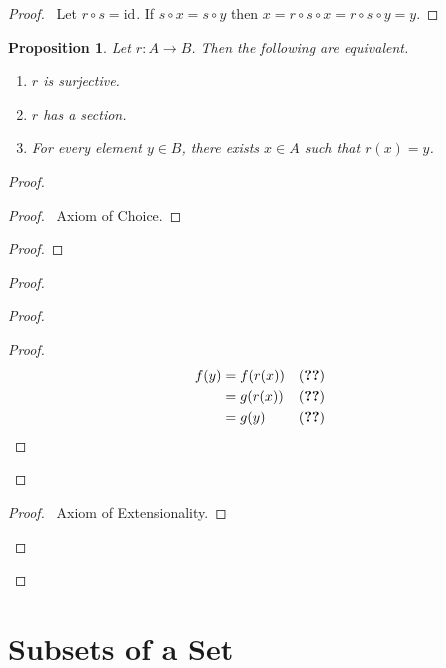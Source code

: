 \documentclass{book}
\let\qed\relax
\newtheorem{prop}[ax]{Proposition}
\theoremstyle{definition}
\newcommand{\id}[1]{\ensuremath{\mathrm{id}_{#1}}}
\begin{document}
\begin{proof}
\pf\ Let $r \circ s = \id{}$. If $s \circ x = s \circ y$ then $x = r \circ s \circ x = r \circ s \circ y = y$. \qed
\end{proof}

\begin{prop}
Let $r : A \rightarrow B$. Then the following are equivalent.
\begin{enumerate}
\item $r$ is surjective.
\item $r$ has a section.
\item For every element $y \in B$, there exists $x \in A$ such that $r(x) = y$.
\end{enumerate}
\end{prop}

\begin{proof}
\pf
{}
\begin{proof}
	\pf\ Axiom of Choice.
\end{proof}
\begin{proof}
\end{proof}
\begin{proof}
	\begin{proof}
		\begin{proof}
			\pf
			\begin{align*}
				f(y) & = f(r(x)) & (\text{\stepref{ii}}) \\
				& = g(r(x)) & (\text{\stepref{c}}) \\
				& = g(y) & (\text{\stepref{ii}})
			\end{align*}
		\end{proof}
	\end{proof}
	\begin{proof}
		\pf\ Axiom of Extensionality.
	\end{proof}
\end{proof}
\end{proof}

\section{Subsets of a Set}
\end{document}
